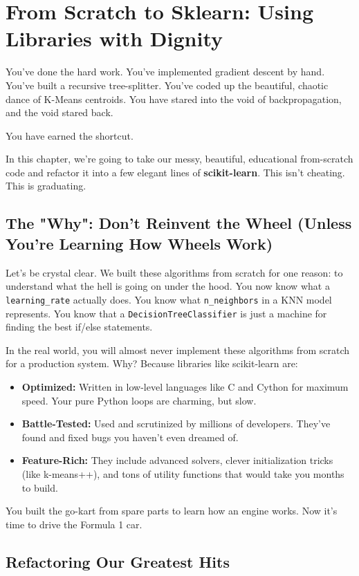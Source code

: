 \documentclass[11pt, letterpaper, openany]{book}
\begin{document}
\chapter{From Scratch to Sklearn: Using Libraries with Dignity}

You've done the hard work. You've implemented gradient descent by hand. You've built a recursive tree-splitter. You've coded up the beautiful, chaotic dance of K-Means centroids. You have stared into the void of backpropagation, and the void stared back.

You have earned the shortcut.

In this chapter, we're going to take our messy, beautiful, educational from-scratch code and refactor it into a few elegant lines of \textbf{scikit-learn}. This isn't cheating. This is graduating.

\section{The "Why": Don't Reinvent the Wheel (Unless You're Learning How Wheels Work)}

Let's be crystal clear. We built these algorithms from scratch for one reason: to understand what the hell is going on under the hood. You now know what a \texttt{learning\_rate} actually does. You know what \texttt{n\_neighbors} in a KNN model represents. You know that a \texttt{DecisionTreeClassifier} is just a machine for finding the best if/else statements.

In the real world, you will almost never implement these algorithms from scratch for a production system. Why? Because libraries like scikit-learn are:
\begin{itemize}
    \item \textbf{Optimized:} Written in low-level languages like C and Cython for maximum speed. Your pure Python loops are charming, but slow.
    \item \textbf{Battle-Tested:} Used and scrutinized by millions of developers. They've found and fixed bugs you haven't even dreamed of.
    \item \textbf{Feature-Rich:} They include advanced solvers, clever initialization tricks (like k-means++), and tons of utility functions that would take you months to build.
\end{itemize}
You built the go-kart from spare parts to learn how an engine works. Now it's time to drive the Formula 1 car.

\section{Refactoring Our Greatest Hits}
\end{document}

